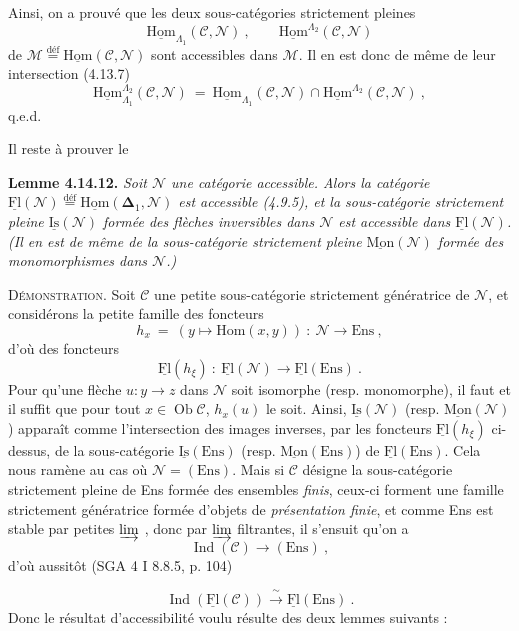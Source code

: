 \documentclass[11pt]{article}
\newcommand{\printedpage}[1]{\marginpar{\footnotesize p.~#1}}
\newcommand{\msp}[1]{\marginpar{\footnotesize [#1]}}
\newcommand{\Ob}{\operatorname{Ob}}
\DeclareMathOperator{\Ind}{Ind}
\newcommand{\defeq}{\overset{\text{déf}}{=}}
\newcommand{\uHom}{\underline{\mathrm{Hom}}}
\newcommand{\uFl}{\underline{\mathrm{Fl}}}
\newcommand{\uIs}{\underline{\mathrm{Is}}}
\newcommand{\uMon}{\underline{\mathrm{Mon}}}
\newcommand{\Ens}{\mathrm{Ens}}
\begin{document}
\msp{page 384}
Ainsi, on a prouvé que les deux sous-catégories strictement pleines
\[
\uHom_{\Lambda_1}(\mathcal{C},\mathcal{N}) \ , \qquad \uHom^{\Lambda_2}(\mathcal{C},\mathcal{N})
\]
de $\mathcal{M} \defeq \uHom(\mathcal{C},\mathcal{N})$ sont accessibles dans $\mathcal{M}$. Il en est donc de même de leur intersection (4.13.7)
\[
\uHom^{\Lambda_2}_{\Lambda_1}(\mathcal{C},\mathcal{N}) \ = \ \uHom_{\Lambda_1}(\mathcal{C},\mathcal{N}) \cap \uHom^{\Lambda_2}(\mathcal{C},\mathcal{N}) \ ,
\]
q.e.d.

Il reste à prouver le

\textbf{Lemme 4.14.12.} \textit{Soit $\mathcal{N}$ une catégorie accessible. Alors la catégorie $\uFl(\mathcal{N}) \defeq \uHom(\boldsymbol{\Delta}_1,\mathcal{N})$ est accessible (4.9.5), et la sous-catégorie strictement pleine $\uIs(\mathcal{N})$ formée des flèches inversibles dans $\mathcal{N}$ est accessible dans $\uFl(\mathcal{N})$. (Il en est de même de la sous-catégorie strictement pleine $\uMon(\mathcal{N})$ formée des monomorphismes dans $\mathcal{N}$.)}

\textsc{Démonstration}. Soit $\mathcal{C}$ une petite sous-catégorie strictement génératrice de $\mathcal{N}$, et considérons la petite famille des foncteurs
\[
h_x \ = \ (y \longmapsto \mathrm{Hom}(x,y)) \ : \ \mathcal{N} \longrightarrow \Ens \ ,
\]
\printedpage{146}
\msp{page 385}
d'où des foncteurs
\[
\uFl(h_\xi) \ : \ \uFl(\mathcal{N}) \longrightarrow \uFl(\Ens) \ . %
\]
Pour qu'une flèche $u : y \longrightarrow z$ dans $\mathcal{N}$ soit isomorphe (resp. monomorphe), il faut et il suffit que pour tout $x \in \Ob\mathcal{C}$, $h_x(u)$ le soit. Ainsi, $\uIs(\mathcal{N})$ (resp. $\uMon(\mathcal{N})$) apparaît comme l'intersection des images inverses, par les foncteurs $\uFl(h_\xi)$ ci-dessus, de la sous-catégorie $\uIs(\Ens)$ (resp. $\uMon(\Ens)$) de $\uFl(\Ens)$. Cela nous ramène au cas où $\mathcal{N} = (\Ens)$. Mais si $\mathcal{C}$ désigne la sous-catégorie strictement pleine de Ens formée des ensembles \textit{finis}, ceux-ci forment une famille strictement génératrice formée d'objets de \textit{présentation finie}, et comme Ens est stable par petites $\varinjlim$ , donc par $\varinjlim$ filtrantes, il s'ensuit qu'on a %
\[
\Ind(\mathcal{C}) \longrightarrow (\Ens) \ , \tag*{$(*)$}
\]
d'où aussitôt (SGA 4 I 8.8.5, p. 104)

\msp{page 386}
\[
\Ind(\uFl(\mathcal{C})) \xrightarrow{\ \sim\ } \uFl(\Ens) \ . \tag*{$(*)$}
\]
Donc le résultat d'accessibilité voulu résulte des deux lemmes suivants :
\end{document}
